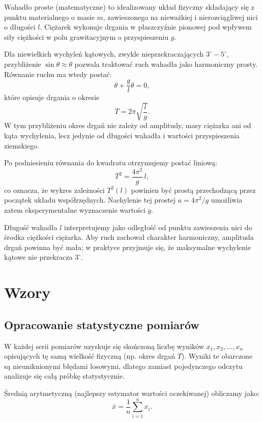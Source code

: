 \documentclass{fizykalab}
\begin{document}
Wahadło proste (matematyczne) to idealizowany układ fizyczny
składający się z punktu materialnego o masie \( m \), zawieszonego
na nieważkiej i nierozciągliwej nici o długości \( l \).
Ciężarek wykonuje drgania w płaszczyźnie pionowej
pod wpływem siły ciężkości w polu grawitacyjnym
o przyspieszeniu \( g \).

Dla niewielkich wychyleń kątowych, zwykle nieprzekraczających
\(3^\circ\!-\!5^\circ\), przybliżenie
\(\sin \theta \approx \theta\) pozwala traktować ruch wahadła
jako harmoniczny prosty. Równanie ruchu ma wtedy postać:
\[
  \ddot{\theta} + \frac{g}{l}\theta = 0,
\]
które opisuje drgania o okresie
\[
  T = 2\pi\sqrt{\frac{l}{g}}.
\]
W tym przybliżeniu okres drgań nie zależy od amplitudy,
masy ciężarka ani od kąta wychylenia, lecz jedynie od długości
wahadła i wartości przyspieszenia ziemskiego.

\vspace{1em}
Po podniesieniu równania do kwadratu otrzymujemy postać liniową:
\[
  T^2 = \frac{4\pi^2}{g}\,l,
\]
co oznacza, że wykres zależności \(T^2(l)\) powinien być prostą
przechodzącą przez początek układu współrzędnych.
Nachylenie tej prostej \(a = 4\pi^2/g\) umożliwia zatem
eksperymentalne wyznaczenie wartości \(g\).

\vspace{1em}
Długość wahadła \( l \) interpretujemy jako odległość od punktu
zawieszenia nici do środka ciężkości ciężarka.
Aby ruch zachował charakter harmoniczny,
amplituda drgań powinna być mała; w praktyce przyjmuje się,
że maksymalne wychylenie kątowe nie przekracza \(3^\circ\).

\pagebreak

\section{Wzory}

\subsection{Opracowanie statystyczne pomiarów}

W każdej serii pomiarów uzyskuje się skończoną liczbę wyników
\( x_1, x_2, \ldots, x_n \)
opisujących tę samą wielkość fizyczną (np. okres drgań \(T\)).
Wyniki te obarczone są nieuniknionymi błędami losowymi,
dlatego zamiast pojedynczego odczytu analizuje się całą próbkę
statystycznie.

\vspace{1em}
Średnią arytmetyczną (najlepszy estymator wartości oczekiwanej)
obliczamy jako:
\begin{equation}
  \bar{x} = \frac{1}{n}\sum_{i=1}^{n} x_i.
\end{equation}
\end{document}

